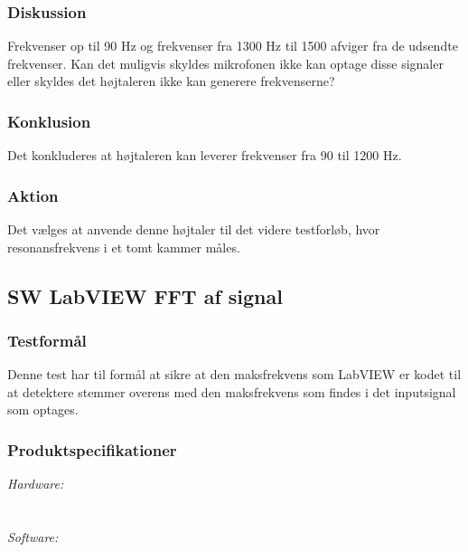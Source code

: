 		\subsubsection{Diskussion} 
		Frekvenser op til 90 Hz og frekvenser fra 1300 Hz til 1500 afviger fra de udsendte frekvenser. Kan det muligvis skyldes mikrofonen ikke kan optage disse signaler eller skyldes det højtaleren ikke kan generere frekvenserne? 
		\subsubsection{Konklusion}
	Det konkluderes at højtaleren kan leverer frekvenser fra 90 til 1200 Hz. 
	    \subsubsection{Aktion}
	    Det vælges at anvende denne højtaler til det videre testforløb, hvor resonansfrekvens i et tomt kammer måles. 
	    
\subsection{SW LabVIEW FFT af signal}	
\subsubsection{Testformål}
		Denne test har til formål at sikre at den maksfrekvens som LabVIEW er kodet til at detektere stemmer overens med den maksfrekvens som findes i det inputsignal som optages.  
		\subsubsection{Produktspecifikationer}
	
		\textit{Hardware:}\\
		\PC\\
		\daq\\
	
		\textit{Software:}\\
		\labview\\
		\visa\\
		\vi\\
		\daqsoft\\
		\onlineg\\ 
	
